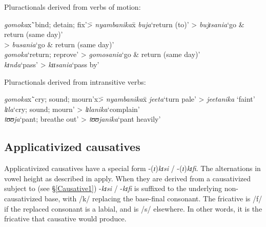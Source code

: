 \begin{exe}
\begin{xlist}
\ex Pluractionals derived from verbs of motion: \label{exPluractionalMotion}
\begin{tabbing}
\textit{gomoka}x\=`bind; detain; fix'\=> \textit{nyambanika}x\= \kill%
\textit{buja}\>`return (to)'\> > \textit{bujɪsania}\>`go \& return (same day)'\\
\>\> > \textit{busania}\>`go \& return (same day)'\\
\textit{gomoka}\>`return; reprove'\> > \textit{gomosania}\>`go \& return (same day)'\\
\textit{kɪnda}\>\lq pass'\> > \textit{kɪɪsania}\>`pass by'
\end{tabbing}
\ex Pluractionals derived from intransitive verbs: \label{exPluractionalIntransitive}
\begin{tabbing}
	\textit{gomoka}x\=`cry; sound; mourn'x\=> \textit{nyambanika}x\= \kill%
	\textit{jeeta}\>\lq turn pale'\> > \textit{jeetanika} \>`faint'\\
	\textit{lɪla}\>`cry; sound; mourn'\> > \textit{lɪlanika}\>`complain'\\
	\textit{tʊʊja}\>`pant; breathe out'\> > \textit{tʊʊjanika}\>`pant heavily'
\end{tabbing}
\end{xlist}
\end{exe}
\subsection{Applicativized causatives} \label{ApplicativizedCausatives}
Applicativized causatives have a special form -(\textit{ɪ})\textit{kɪsi} / -(\textit{ɪ})\textit{kɪfi}. The alternations in vowel height as described in  apply. When they are derived from a causativized  subject to  (see §\ref{Causative1}) -\textit{kɪsi} / -\textit{kɪfi} is suffixed to the underlying non-causativized base, with /k/ replacing the base-final consonant. The fricative is /f/ if the replaced consonant is a labial, and is /s/ elsewhere. In other words, it is the fricative that causative  would produce.

